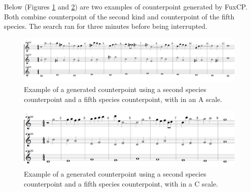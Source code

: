 Below (Figures \ref{fig:musicality-5sp-la} and \ref{fig:musicality-5sp-do}) are two examples of counterpoint generated by FuxCP. Both combine counterpoint of the second kind and counterpoint of the fifth species. The search ran for three minutes before being interrupted.

\begin{figure}[h!]
    \centering
    \includegraphics[width=1\textwidth]{Images/Musicality/musicality-5sp-la.png}
    \caption{Example of a generated counterpoint using a second species counterpoint and a fifth species counterpoint, with in an A scale.}
    \label{fig:musicality-5sp-la}
\end{figure}

\begin{figure}[h!]
    \centering
    \includegraphics[width=1\textwidth]{Images/Musicality/musicality-5sp-do.png}
    \caption{Example of a generated counterpoint using a second species counterpoint and a fifth species counterpoint, with in a C scale.}
    \label{fig:musicality-5sp-do}
\end{figure}